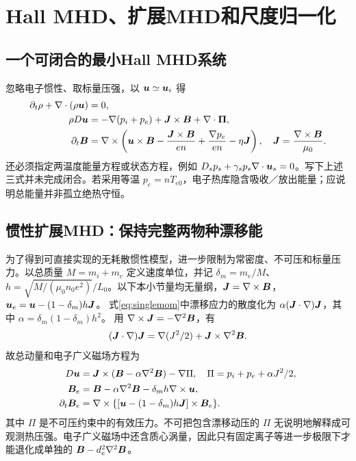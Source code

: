 

\section{Hall MHD、扩展MHD和尺度归一化}
\subsection{一个可闭合的最小Hall MHD系统}
忽略电子惯性、取标量压强，以 $\bm{u}\simeq\bm{u}_i$ 得
\begin{align}
\partial_t\rho+\nabla\cdot(\rho\bm{u})&=0,\\
\rho D\bm{u}&=-\nabla(p_i+p_e)+\bm{J}\times\bm{B}+\nabla\cdot\bm{\Pi},\\
\partial_t\bm{B}&=\nabla\times\left(\bm{u}\times\bm{B}-{\bm{J}\times\bm{B}\over en}+{\nabla p_e\over en}-\eta\bm{J}\right),\quad\bm{J}={\nabla\times\bm{B}\over\mu_0}.\label{eq:hallinduction}
\end{align}
还必须指定两温度能量方程或状态方程，例如 $D_sp_s+\gamma_sp_s\nabla\cdot\bm{u}_s=0$。写下上述三式并未完成闭合。若采用等温 $p_e=nT_{e0}$，电子热库隐含吸收／放出能量；应说明总能量并非孤立绝热守恒。

\subsection{惯性扩展MHD：保持完整两物种漂移能}
为了得到可直接实现的无耗散惯性模型，进一步限制为常密度、不可压和标量压力。以总质量 $M=m_i+m_e$ 定义速度单位，并记 $\delta_m=m_e/M$、$h=\sqrt{M/(\mu_0n_0e^2)}/L_0$。以下本小节量均无量纲，$\bm{J}=\nabla\times\bm{B}$，$\bm{u}_e=\bm{u}-(1-\delta_m)h\bm{J}$。
式\eqref{eq:singlemom}中漂移应力的散度化为
$\alpha(\bm{J}\cdot\nabla)\bm{J}$，其中 $\alpha=\delta_m(1-\delta_m)h^2$。
用 $\nabla\times\bm{J}=-\nabla^2\bm{B}$，有
\begin{equation}
(\bm{J}\cdot\nabla)\bm{J}=\nabla(J^2/2)+\bm{J}\times\nabla^2\bm{B}.
\end{equation}
故总动量和电子广义磁场方程为
\begin{align}
D\bm{u}&=\bm{J}\times(\bm{B}-\alpha\nabla^2\bm{B})-\nabla\Pi,
\quad\Pi=p_i+p_e+\alpha J^2/2,\\
\bm{B}_e&=\bm{B}-\alpha\nabla^2\bm{B}-\delta_mh\nabla\times\bm{u},\\
\partial_t\bm{B}_e&=\nabla\times\{[\bm{u}-(1-\delta_m)h\bm{J}]\times\bm{B}_e\}.
\end{align}
其中 $\Pi$ 是不可压约束中的有效压力。不可把包含漂移动压的 $\Pi$ 无说明地解释成可观测热压强。电子广义磁场中还含质心涡量，因此只有固定离子等进一步极限下才能退化成单独的 $\bm{B}-d_e^2\nabla^2\bm{B}$。

